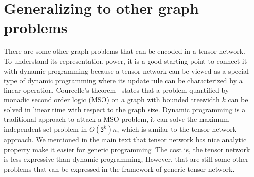 \documentclass[onefignum, onetabnum]{siamart190516}
\newcommand{\<}{\langle}
\renewcommand{\>}{\rangle}
\newcommand{\Eq}[1]{Eq.~(\ref{#1})}
\newcounter{example}
\begin{document}
\section{Generalizing to other graph problems}\label{app:otherproblems}
There are some other graph problems that can be encoded in a tensor network.
To understand its representation power, it is a good starting point to connect it with dynamic programming because
a tensor network can be viewed as a special type of dynamic programming where its update rule can be characterized by a linear operation.
Courcelle’s theorem~\cite{Courcelle1990,Barr2020} states that a problem quantified by monadic second order logic (MSO) on a graph with bounded treewidth $k$ can be solved in linear time with respect to the graph size.
Dynamic programming is a traditional approach to attack a MSO problem, it can solve the maximum independent set problem in $O(2^k)n$, which is similar to the tensor network approach.
We mentioned in the main text that tensor network has nice analytic property make it easier for generic programming.
The cost is, the tensor network is less expressive than dynamic programming,
However, that are still some other problems that can be expressed in the framework of generic tensor network.
\end{document}
